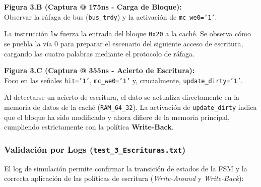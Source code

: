 \documentclass[12pt,a4paper]{article}
\begin{document}
\vspace{1em} %

\textbf{Figura 3.B (Captura @ 175ns - Carga de Bloque):} \\
Observar la ráfaga de bus (\texttt{bus\_trdy}) y la activación de \texttt{mc\_we0='1'}. 

La instrucción \texttt{lw} fuerza la entrada del bloque \texttt{0x20} a la caché. Se observa cómo se puebla la vía 0 para preparar el escenario del siguiente acceso de escritura, cargando las cuatro palabras mediante el protocolo de ráfaga.

\vspace{1em}

\textbf{Figura 3.C (Captura @ 355ns - Acierto de Escritura):} \\
Foco en las señales \texttt{hit='1'}, \texttt{mc\_we0='1'} y, crucialmente, \texttt{update\_dirty='1'}.

Al detectarse un acierto de escritura, el dato se actualiza directamente en la memoria de datos de la caché (\texttt{RAM\_64\_32}). La activación de \texttt{update\_dirty} indica que el bloque ha sido modificado y ahora difiere de la memoria principal, cumpliendo estrictamente con la política \textbf{Write-Back}.
\newpage
\newpage
\subsubsection{Validación por Logs (\texttt{test\_3\_Escrituras.txt})}

El log de simulación permite confirmar la transición de estados de la FSM y la correcta aplicación de las políticas de escritura (\textit{Write-Around} y \textit{Write-Back}):
\end{document}
